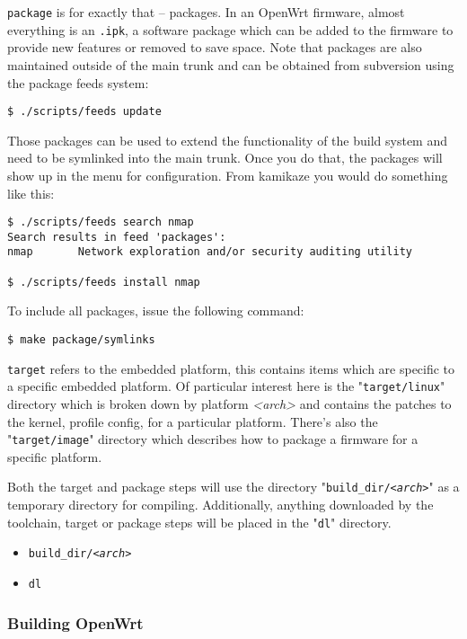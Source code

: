 \texttt{package} is for exactly that -- packages. In an OpenWrt firmware, almost everything
is an \texttt{.ipk}, a software package which can be added to the firmware to provide new
features or removed to save space. Note that packages are also maintained outside of the main
trunk and can be obtained from subversion using the package feeds system:

\begin{Verbatim}
$ ./scripts/feeds update
\end{Verbatim}

Those packages can be used to extend the functionality of the build system and need to be
symlinked into the main trunk. Once you do that, the packages will show up in the menu for
configuration. From kamikaze you would do something like this:

\begin{Verbatim}
$ ./scripts/feeds search nmap
Search results in feed 'packages':
nmap       Network exploration and/or security auditing utility

$ ./scripts/feeds install nmap
\end{Verbatim}

To include all packages, issue the following command:

\begin{Verbatim}
$ make package/symlinks
\end{Verbatim}

\texttt{target} refers to the embedded platform, this contains items which are specific to
a specific embedded platform. Of particular interest here is the "\texttt{target/linux}"
directory which is broken down by platform \textit{<arch>} and contains the patches to the
kernel, profile config, for a particular platform. There's also the "\texttt{target/image}" directory
which describes how to package a firmware for a specific platform.

Both the target and package steps will use the directory "\texttt{build\_dir/\textit{<arch>}}"
as a temporary directory for compiling. Additionally, anything downloaded by the toolchain,
target or package steps will be placed in the "\texttt{dl}" directory.

\begin{itemize}
    \item \texttt{build\_dir/\textit{<arch>}}
    \item \texttt{dl}
\end{itemize}

\subsubsection{Building OpenWrt}


